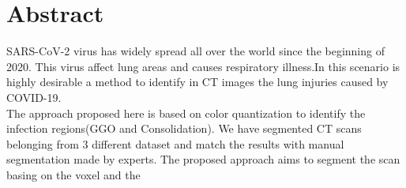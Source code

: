 \documentclass{standalone}
\begin{document}
	\chapter*{Abstract}

	SARS-CoV-2 virus has widely spread all over the world since the beginning of 2020. This virus affect lung areas and causes respiratory illness.In this scenario is highly desirable a method to identify in CT images the lung injuries caused by COVID-19.\\
	The approach proposed here is based on color quantization to identify the infection regions(GGO and Consolidation). 
	We have segmented CT scans belonging from 3 different dataset and match the results with manual segmentation made by experts.
	The proposed approach aims to segment the scan basing on the voxel and the
\end{document}

